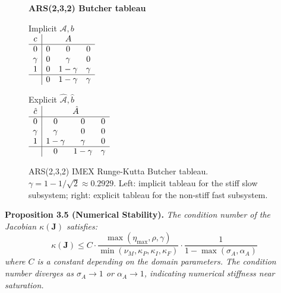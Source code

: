 \begin{figure}[htbp]
\centering
\textbf{ARS(2,3,2) Butcher tableau}\\[2mm]
\begin{minipage}{0.45\textwidth}
\centering
Implicit $\mathcal{A}, b$\\
$\begin{array}{c|ccc}
c & \multicolumn{3}{c}{A} \\ \hline
0 & 0 & 0 & 0 \\
\gamma & 0 & \gamma & 0 \\
1 & 0 & 1-\gamma & \gamma \\ \hline
& 0 & 1-\gamma & \gamma
\end{array}$
\end{minipage}
\hfill
\begin{minipage}{0.45\textwidth}
\centering
Explicit $\hat{\mathcal{A}}, \hat{b}$\\
$\begin{array}{c|ccc}
\hat{c} & \multicolumn{3}{c}{\hat{A}} \\ \hline
0 & 0 & 0 & 0 \\
\gamma & \gamma & 0 & 0 \\
1 & 1-\gamma & \gamma & 0 \\ \hline
& 0 & 1-\gamma & \gamma
\end{array}$
\end{minipage}
\caption{ARS(2,3,2) IMEX Runge-Kutta Butcher tableau. $\gamma = 1 - 1/\sqrt{2} \approx 0.2929$. Left: implicit tableau for the stiff slow subsystem; right: explicit tableau for the non-stiff fast subsystem.}\label{fig:butcher-tableau}
\end{figure}

\textbf{Proposition 3.5 (Numerical Stability).} %
\textit{The condition number of the Jacobian $\kappa(\mathbf{J})$ satisfies:
\begin{equation}\label{eq:condition-number}
\kappa(\mathbf{J}) \leq C \cdot \frac{\max(\eta_{\max}, \rho, \gamma)}{\min(\nu_M, \kappa_P, \kappa_I, \kappa_F)} \cdot \frac{1}{1 - \max(\sigma_A, \alpha_A)}
\end{equation}
where $C$ is a constant depending on the domain parameters. The condition
number diverges as $\sigma_A \to 1$ or $\alpha_A \to 1$, indicating
numerical stiffness near saturation.}


